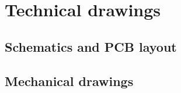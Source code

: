 \chapter{Technical drawings}
\section{Schematics and PCB layout}
\label{sec:pcb}
% 
% 
\section{Mechanical drawings}
